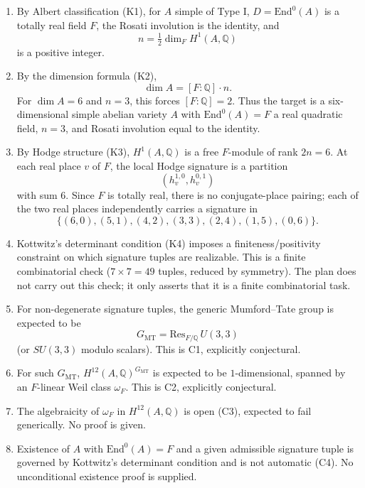 \documentclass{article}
\begin{document}
\begin{enumerate}
  \item By Albert classification (K1), for $A$ simple of Type I, $D=\mathrm{End}^0(A)$ is a totally real field $F$, the Rosati involution is the identity, and
  \[
    n=\tfrac12 \dim_F H^1(A,\mathbb{Q})
  \]
  is a positive integer.

  \item By the dimension formula (K2),
  \[
    \dim A=[F:\mathbb{Q}]\cdot n.
  \]
  For $\dim A=6$ and $n=3$, this forces $[F:\mathbb{Q}]=2$. Thus the target is a six-dimensional simple abelian variety $A$ with $\mathrm{End}^0(A)=F$ a real quadratic field, $n=3$, and Rosati involution equal to the identity.

  \item By Hodge structure (K3), $H^1(A,\mathbb{Q})$ is a free $F$-module of rank $2n=6$. At each real place $v$ of $F$, the local Hodge signature is a partition
  \[
    (h^{1,0}_v,h^{0,1}_v)
  \]
  with sum $6$. Since $F$ is totally real, there is no conjugate-place pairing; each of the two real places independently carries a signature in
  \[
    \{(6,0),(5,1),(4,2),(3,3),(2,4),(1,5),(0,6)\}.
  \]

  \item Kottwitz's determinant condition (K4) imposes a finiteness/positivity constraint on which signature tuples are realizable. This is a finite combinatorial check ($7\times 7=49$ tuples, reduced by symmetry). The plan does not carry out this check; it only asserts that it is a finite combinatorial task.

  \item For non-degenerate signature tuples, the generic Mumford--Tate group is expected to be
  \[
    G_{\mathrm{MT}}=\mathrm{Res}_{F/\mathbb{Q}}\, U(3,3)
  \]
  (or $SU(3,3)$ modulo scalars). This is C1, explicitly conjectural.

  \item For such $G_{\mathrm{MT}}$, $H^{12}(A,\mathbb{Q})^{G_{\mathrm{MT}}}$ is expected to be $1$-dimensional, spanned by an $F$-linear Weil class $\omega_F$. This is C2, explicitly conjectural.

  \item The algebraicity of $\omega_F$ in $H^{12}(A,\mathbb{Q})$ is open (C3), expected to fail generically. No proof is given.

  \item Existence of $A$ with $\mathrm{End}^0(A)=F$ and a given admissible signature tuple is governed by Kottwitz's determinant condition and is not automatic (C4). No unconditional existence proof is supplied.
\end{enumerate}
\end{document}
